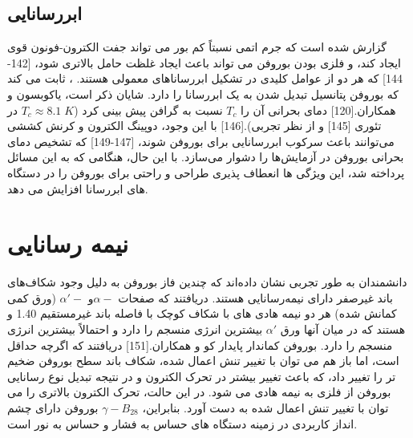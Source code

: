 \subsection{ابررسانایی}
گزارش شده است که جرم اتمی نسبتاً کم بور می تواند جفت الکترون-فونون قوی ایجاد کند، و فلزی بودن بوروفن می تواند باعث ایجاد غلظت حامل بالاتری شود، [142-144] که هر دو از عوامل کلیدی در تشکیل ابررساناهای معمولی هستند. ، ثابت می کند که بوروفن پتانسیل تبدیل شدن به یک ابررسانا را دارد. شایان ذکر است، یاکوبسون و همکاران.[120] دمای بحرانی آن را $T_c$ نسبت به گرافن پیش بینی کرد ($T_c ≈ 8.1\; K$ در تئوری [145] و  از نظر تجربی).[146] با این وجود، دوپینگ الکترون و کرنش کششی می‌توانند باعث سرکوب ابررسانایی برای بوروفن شوند، [147-149] که تشخیص دمای بحرانی بوروفن در آزمایش‌ها را دشوار می‌سازد. با این حال، هنگامی که به این مسائل پرداخته شد، این ویژگی ها انعطاف پذیری طراحی و راحتی برای بوروفن را در دستگاه های ابررسانا افزایش می دهد.
\section{نیمه رسانایی}
دانشمندان به طور تجربی نشان داده‌اند که چندین فاز بوروفن به دلیل وجود شکاف‌های باند غیرصفر دارای نیمه‌رسانایی هستند. دریافتند که صفحات $\alpha-$و $\alpha\prime-$ (ورق کمی کمانش شده) هر دو نیمه هادی های با شکاف کوچک با فاصله باند غیرمستقیم 1.40 و  هستند که در میان آنها ورق $\alpha\prime$ بیشترین انرژی منسجم را دارد و احتمالاً بیشترین انرژی منسجم را دارد. بوروفن کماندار پایدار کو و همکاران.[151] دریافتند که اگرچه حداقل است، اما باز هم می توان با تغییر تنش اعمال شده، شکاف باند سطح بوروفن ضخیم تر را تغییر داد، که باعث تغییر بیشتر در تحرک الکترون و در نتیجه تبدیل نوع رسانایی بوروفن از فلزی به نیمه هادی می شود. در این حالت، تحرک الکترون بالاتری را می توان با تغییر تنش اعمال شده به دست آورد. بنابراین، $\gamma-B_28$ بوروفن دارای چشم انداز کاربردی در زمینه دستگاه های حساس به فشار و حساس به نور است.

